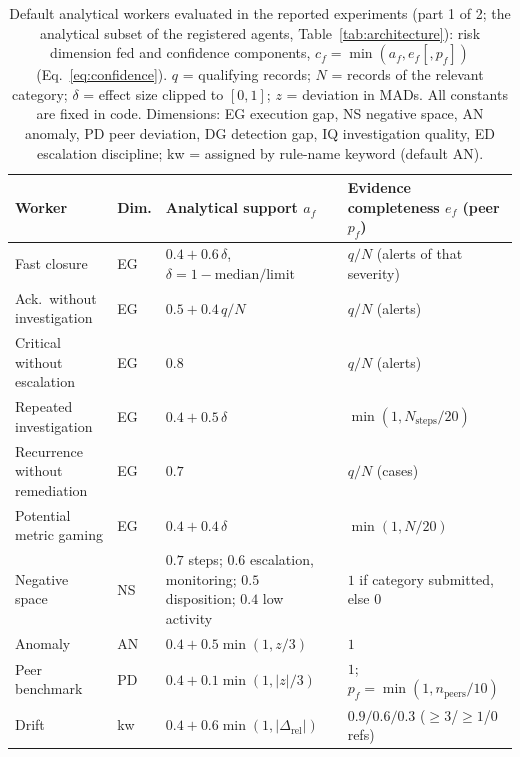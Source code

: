 \begin{table}[!htbp]
\caption{Default analytical workers evaluated in the reported experiments (part 1 of
2; the analytical subset of the registered agents, Table~\ref{tab:architecture}): risk
dimension fed and confidence components, $c_f=\min(a_f,e_f[,p_f])$
(Eq.~\eqref{eq:confidence}). $q$ = qualifying records; $N$ = records of the relevant
category; $\delta$ = effect size clipped to $[0,1]$; $z$ = deviation in MADs. All
constants are fixed in code. Dimensions: EG execution gap, NS negative space, AN
anomaly, PD peer deviation, DG detection gap, IQ investigation quality, ED escalation
discipline; kw = assigned by rule-name keyword (default AN).}
\label{tab:workers}
\centering
\small
\setlength{\tabcolsep}{3pt}
\begin{tabular}{@{}L{2.7cm}L{0.9cm}L{4.4cm}L{3.5cm}@{}}
\toprule
Worker & Dim. & Analytical support $a_f$ & Evidence completeness $e_f$ (peer $p_f$) \\
\midrule
Fast closure & EG & $0.4+0.6\,\delta$, $\delta=1-\text{median}/\text{limit}$ & $q/N$ (alerts of that severity) \\
Ack.\ without investigation & EG & $0.5+0.4\,q/N$ & $q/N$ (alerts) \\
Critical without escalation & EG & $0.8$ & $q/N$ (alerts) \\
Repeated investigation & EG & $0.4+0.5\,\delta$ & $\min(1,N_{\text{steps}}/20)$ \\
Recurrence without remediation & EG & $0.7$ & $q/N$ (cases) \\
Potential metric gaming & EG & $0.4+0.4\,\delta$ & $\min(1,N/20)$ \\
Negative space & NS & $0.7$ steps; $0.6$ escalation, monitoring; $0.5$ disposition; $0.4$ low activity & $1$ if category submitted, else $0$ \\
Anomaly & AN & $0.4+0.5\min(1,z/3)$ & $1$ \\
Peer benchmark & PD & $0.4+0.1\min(1,|z|/3)$ & $1$; $p_f=\min(1,n_{\text{peers}}/10)$ \\
Drift & kw & $0.4+0.6\min(1,|\Delta_{\text{rel}}|)$ & $0.9/0.6/0.3$ (${\ge}3$/${\ge}1$/$0$ refs) \\
\bottomrule
\end{tabular}
\end{table}

